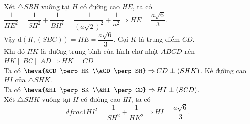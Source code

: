 \begin{ex}
{\begin{itemchoice}
		Xét $\triangle SBH$ vuông tại $H$ có  đường cao $HE$, ta có\\
		$\dfrac{1}{HE^2}=\dfrac{1}{SH^2}+\dfrac{1}{BH^2}=\dfrac{1}{(a\sqrt{2})^2}+\dfrac{1}{a^2} 
		\Rightarrow  HE=\dfrac{a\sqrt{6}}{3}$.\\
		 Vậy $\mathrm{d}\left(H,(SBC)\right)=HE=\dfrac{a\sqrt{6}}{3}$.
		\itemch  Gọi $K$ là trung điểm $CD$.\\
		Khi đó $HK$ là đường trung bình của hình chữ nhật $ABCD$ nên  $HK \parallel BC \parallel AD \Rightarrow HK \perp CD$.\\
		Ta có 
		$\heva{&CD \perp HK \\&CD \perp SH} \Rightarrow CD \perp (SHK)$. 
		\itemch Kẻ đường cao $HI$  của $\triangle SHK$.\\
		 Ta có
		$\heva{&HI \perp  SK \\&HI \perp CD} \Rightarrow HI \perp (SCD)$.\\
		Xét $\triangle SHK$ vuông  tại $H$ có đường cao $HI$, ta có
		 \[dfrac{1}{HI^2}=\dfrac{1}{SH^2}+\dfrac{1}{HK^2}
		 \Rightarrow HI=\dfrac{a\sqrt{6}}{3}.\]
\end{itemchoice}}
\end{ex}

